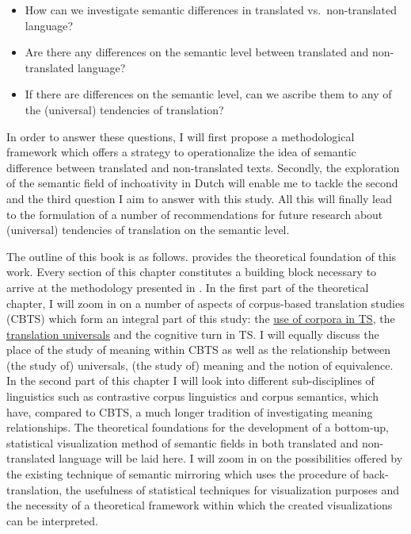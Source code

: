 \begin{itemize}
\item 
How can we investigate semantic differences in translated vs.\ non-trans\-lated language?
\item 
Are there any differences on the semantic level between translated and non-translated language? 
\item 
If there are differences on the semantic level, can we ascribe them to any of the (universal) tendencies of translation?
\end{itemize}

In order to answer these questions, I will first propose a methodological framework which offers a strategy to operationalize the idea of semantic difference between translated and non-translated texts. Secondly, the exploration of the semantic field of inchoativity in Dutch will enable me to tackle the second and the third question I aim to answer with this study. All this will finally lead to the formulation of a number of recommendations for future research about (universal) tendencies of translation on the semantic level.

The outline of this book is as follows.  provides the theoretical foundation of this work. Every section of this chapter constitutes a building block necessary to arrive at the methodology presented in . In the first part of the theoretical chapter, I will zoom in on a number of aspects of corpus-based translation studies (CBTS) which form an integral part of this study: the \hyperlink{Corpora}{use of corpora in TS}, the \hyperlink{Bakersuniversals}{translation universals} and the cognitive turn in TS. I will equally discuss the place of the study of meaning within CBTS as well as the relationship between (the study of) universals, (the study of) meaning and the notion of equivalence. In the second part of this chapter I will look into different sub-disciplines of linguistics such as contrastive corpus linguistics and corpus semantics, which have, compared to CBTS, a much longer tradition of investigating meaning relationships. The theoretical foundations for the development of a bottom-up, statistical visualization method of semantic fields in both translated and non-translated language will be laid here. I will zoom in on the possibilities offered by the existing technique of semantic mirroring which uses the procedure of back-translation, the usefulness of statistical techniques for visualization purposes and the necessity of a theoretical framework within which the created visualizations can be interpreted.

